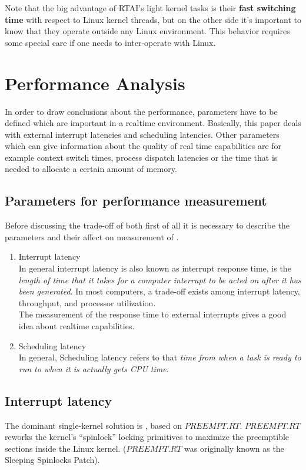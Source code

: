 Note that the big advantage of RTAI's light kernel tasks is their \textbf{fast switching time} with respect to Linux kernel threads, but on the other side it's important to know that they operate outside any Linux environment. This behavior requires some special care if one needs to inter-operate with Linux.

\section{Performance Analysis}\label{sec:performance-analysis}
In order to draw conclusions about the performance, parameters have to be defined which are important in a realtime environment. Basically, this paper deals with external interrupt latencies and scheduling latencies. Other parameters which can give information about the quality of real time capabilities are for example context switch times, process dispatch latencies or the time that is needed to allocate a certain amount of memory. 

\subsection{Parameters for performance measurement}
Before discussing the trade-off of both \rtos \space first of all it is necessary to describe the parameters and their affect on measurement of \rtos.
\begin{enumerate}
    \item Interrupt latency
        \\ In general interrupt latency is also known as interrupt response time, is the \textit{length of time that it takes for a computer interrupt to be acted on after it has been generated}. In most computers, a trade-off exists among interrupt latency, throughput, and processor utilization.
        \\ The measurement of the response time to external interrupts gives a good idea about realtime capabilities.
    \item Scheduling latency
        \\ In general, Scheduling latency refers to that \textit{time from when a task is ready to run to when it is actually gets CPU time}. 
\end{enumerate}

\subsection{Interrupt latency}
The dominant single-kernel solution is \rtlinux, based on $ PREEMPT.RT $. $ PREEMPT.RT $ reworks the kernel’s “spinlock” locking primitives to maximize the preemptible sections inside the Linux kernel. ($ PREEMPT.RT $ was originally known as the Sleeping Spinlocks Patch).

